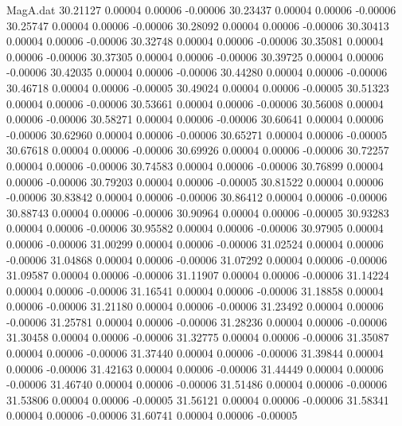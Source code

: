 \begin{filecontents}{MagA.dat}
  30.21127    0.00004    0.00006   -0.00006
  30.23437    0.00004    0.00006   -0.00006
  30.25747    0.00004    0.00006   -0.00006
  30.28092    0.00004    0.00006   -0.00006
  30.30413    0.00004    0.00006   -0.00006
  30.32748    0.00004    0.00006   -0.00006
  30.35081    0.00004    0.00006   -0.00006
  30.37305    0.00004    0.00006   -0.00006
  30.39725    0.00004    0.00006   -0.00006
  30.42035    0.00004    0.00006   -0.00006
  30.44280    0.00004    0.00006   -0.00006
  30.46718    0.00004    0.00006   -0.00005
  30.49024    0.00004    0.00006   -0.00005
  30.51323    0.00004    0.00006   -0.00006
  30.53661    0.00004    0.00006   -0.00006
  30.56008    0.00004    0.00006   -0.00006
  30.58271    0.00004    0.00006   -0.00006
  30.60641    0.00004    0.00006   -0.00006
  30.62960    0.00004    0.00006   -0.00006
  30.65271    0.00004    0.00006   -0.00005
  30.67618    0.00004    0.00006   -0.00006
  30.69926    0.00004    0.00006   -0.00006
  30.72257    0.00004    0.00006   -0.00006
  30.74583    0.00004    0.00006   -0.00006
  30.76899    0.00004    0.00006   -0.00006
  30.79203    0.00004    0.00006   -0.00005
  30.81522    0.00004    0.00006   -0.00006
  30.83842    0.00004    0.00006   -0.00006
  30.86412    0.00004    0.00006   -0.00006
  30.88743    0.00004    0.00006   -0.00006
  30.90964    0.00004    0.00006   -0.00005
  30.93283    0.00004    0.00006   -0.00006
  30.95582    0.00004    0.00006   -0.00006
  30.97905    0.00004    0.00006   -0.00006
  31.00299    0.00004    0.00006   -0.00006
  31.02524    0.00004    0.00006   -0.00006
  31.04868    0.00004    0.00006   -0.00006
  31.07292    0.00004    0.00006   -0.00006
  31.09587    0.00004    0.00006   -0.00006
  31.11907    0.00004    0.00006   -0.00006
  31.14224    0.00004    0.00006   -0.00006
  31.16541    0.00004    0.00006   -0.00006
  31.18858    0.00004    0.00006   -0.00006
  31.21180    0.00004    0.00006   -0.00006
  31.23492    0.00004    0.00006   -0.00006
  31.25781    0.00004    0.00006   -0.00006
  31.28236    0.00004    0.00006   -0.00006
  31.30458    0.00004    0.00006   -0.00006
  31.32775    0.00004    0.00006   -0.00006
  31.35087    0.00004    0.00006   -0.00006
  31.37440    0.00004    0.00006   -0.00006
  31.39844    0.00004    0.00006   -0.00006
  31.42163    0.00004    0.00006   -0.00006
  31.44449    0.00004    0.00006   -0.00006
  31.46740    0.00004    0.00006   -0.00006
  31.51486    0.00004    0.00006   -0.00006
  31.53806    0.00004    0.00006   -0.00005
  31.56121    0.00004    0.00006   -0.00006
  31.58341    0.00004    0.00006   -0.00006
  31.60741    0.00004    0.00006   -0.00005

\end{filecontents}
